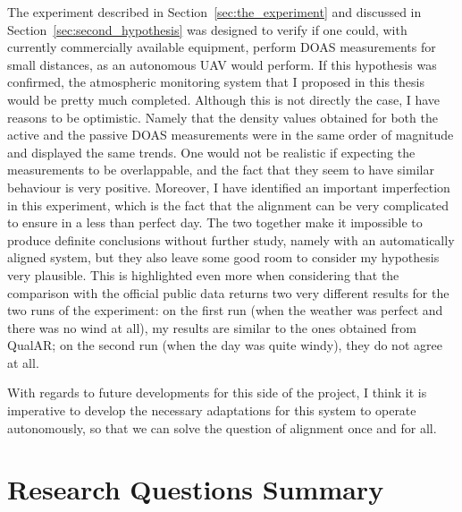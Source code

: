 The experiment described in Section~\ref{sec:the_experiment} and
discussed in Section~\ref{sec:second_hypothesis} was designed to verify
if one could, with currently commercially available equipment, perform
\gls{DOAS} measurements for small distances, as an autonomous \gls{UAV}
would perform. If this hypothesis was confirmed, the atmospheric
monitoring system that I proposed in this thesis would be pretty much
completed. Although this is not directly the case, I have reasons to be
optimistic. Namely that the density values obtained for both the active
and the passive \gls{DOAS} measurements were in the same order of
magnitude and displayed the same trends. One would not be realistic if
expecting the measurements to be overlappable, and the fact that they
seem to have similar behaviour is very positive. Moreover, I have
identified an important imperfection in this experiment, which is the
fact that the alignment can be very complicated to ensure in a less than
perfect day. The two together make it impossible to produce definite
conclusions without further study, namely with an automatically aligned
system, but they also leave some good room to consider my hypothesis
very plausible. This is highlighted even more when considering that the
comparison with the official public data returns two very different
results for the two runs of the experiment: on the first run (when the
weather was perfect and there was no wind at all), my results are
similar to the ones obtained from QualAR; on the second run (when the
day was quite windy), they do not agree at all.

With regards to future developments for this side of the project, I
think it is imperative to develop the necessary adaptations for this
system to operate autonomously, so that we can solve the question of
alignment once and for all.
\newpage
\section{Research Questions Summary}%
\label{sec:research_questions_summary}

